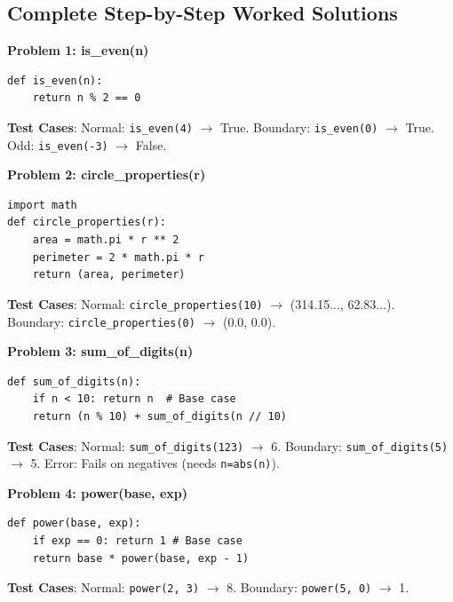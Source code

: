 \subsection{Complete Step-by-Step Worked Solutions}

\begin{solutionbox}[Solutions 1-4]
\noindent\textbf{Problem 1: is\_even(n)}
\begin{lstlisting}[language=Python3]
def is_even(n):
    return n % 2 == 0
\end{lstlisting}
\textbf{Test Cases}: Normal: \texttt{is\_even(4)} $\to$ True. Boundary: \texttt{is\_even(0)} $\to$ True. Odd: \texttt{is\_even(-3)} $\to$ False.

\noindent\textbf{Problem 2: circle\_properties(r)}
\begin{lstlisting}[language=Python3]
import math
def circle_properties(r):
    area = math.pi * r ** 2
    perimeter = 2 * math.pi * r
    return (area, perimeter)
\end{lstlisting}
\textbf{Test Cases}: Normal: \texttt{circle\_properties(10)} $\to$ (314.15..., 62.83...). Boundary: \texttt{circle\_properties(0)} $\to$ (0.0, 0.0).

\noindent\textbf{Problem 3: sum\_of\_digits(n)}
\begin{lstlisting}[language=Python3]
def sum_of_digits(n):
    if n < 10: return n  # Base case
    return (n % 10) + sum_of_digits(n // 10)
\end{lstlisting}
\textbf{Test Cases}: Normal: \texttt{sum\_of\_digits(123)} $\to$ 6. Boundary: \texttt{sum\_of\_digits(5)} $\to$ 5. Error: Fails on negatives (needs \texttt{n=abs(n)}).

\noindent\textbf{Problem 4: power(base, exp)}
\begin{lstlisting}[language=Python3]
def power(base, exp):
    if exp == 0: return 1 # Base case
    return base * power(base, exp - 1)
\end{lstlisting}
\textbf{Test Cases}: Normal: \texttt{power(2, 3)} $\to$ 8. Boundary: \texttt{power(5, 0)} $\to$ 1.
\end{solutionbox}

